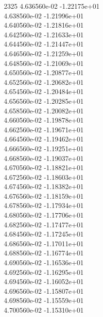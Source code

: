 2325	4.636560e-02	-1.22175e+01	\\ 	4.638560e-02	-1.21996e+01	\\ 	4.640560e-02	-1.21816e+01	\\ 	4.642560e-02	-1.21633e+01	\\ 	4.644560e-02	-1.21447e+01	\\ 	4.646560e-02	-1.21259e+01	\\ 	4.648560e-02	-1.21069e+01	\\ 	4.650560e-02	-1.20877e+01	\\ 	4.652560e-02	-1.20682e+01	\\ 	4.654560e-02	-1.20484e+01	\\ 	4.656560e-02	-1.20285e+01	\\ 	4.658560e-02	-1.20082e+01	\\ 	4.660560e-02	-1.19878e+01	\\ 	4.662560e-02	-1.19671e+01	\\ 	4.664560e-02	-1.19462e+01	\\ 	4.666560e-02	-1.19251e+01	\\ 	4.668560e-02	-1.19037e+01	\\ 	4.670560e-02	-1.18821e+01	\\ 	4.672560e-02	-1.18603e+01	\\ 	4.674560e-02	-1.18382e+01	\\ 	4.676560e-02	-1.18159e+01	\\ 	4.678560e-02	-1.17934e+01	\\ 	4.680560e-02	-1.17706e+01	\\ 	4.682560e-02	-1.17477e+01	\\ 	4.684560e-02	-1.17245e+01	\\ 	4.686560e-02	-1.17011e+01	\\ 	4.688560e-02	-1.16774e+01	\\ 	4.690560e-02	-1.16536e+01	\\ 	4.692560e-02	-1.16295e+01	\\ 	4.694560e-02	-1.16052e+01	\\ 	4.696560e-02	-1.15807e+01	\\ 	4.698560e-02	-1.15559e+01	\\ 	4.700560e-02	-1.15310e+01	\\ \hline
